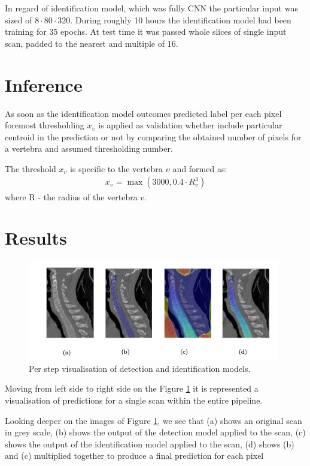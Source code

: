 In regard of identification model, which was fully CNN the particular input was sized of $8 \cdot 80 \cdot 320$. During roughly 10 hours the identification model had been training for 35 epochs. At test time it was passed whole slices of single input scan, padded to the nearest and multiple of 16.

\section{Inference}
As soon as the identification model outcomes predicted label per each pixel foremost thresholding $x_\upsilon$ is applied as validation whether include particular centroid in the prediction or not by comparing the obtained  number of pixels for a vertebra and assumed thresholding number.

The threshold $x_\upsilon$ is specific to the vertebra $\upsilon$ and formed as:
\begin{align*}
  x_\upsilon = \max(3000, 0.4 \cdot R_\upsilon^3) 
\end{align*}
where R - the radius of the vertebra $v$.

\section{Results}
\begin{figure}[h]
    \centering \includegraphics[width=11cm]{images/detection_identification_steps.png}
    \caption {Per step visualisation of detection and identification  models.}
    \label{fig:step_step_predictions}
\end{figure}
Moving from left side to right side on the Figure \ref{fig:step_step_predictions} it is represented a visualisation of predictions for a single scan within the entire pipeline. 

Looking deeper on the images of 
Figure \ref{fig:step_step_predictions}, we see that (a) shows an original scan in grey scale, (b) shows the output of the detection model applied to the scan, (c) shows the output of the identification model applied to the scan, (d) shows (b) and (c) multiplied together to produce a final prediction for each pixel


